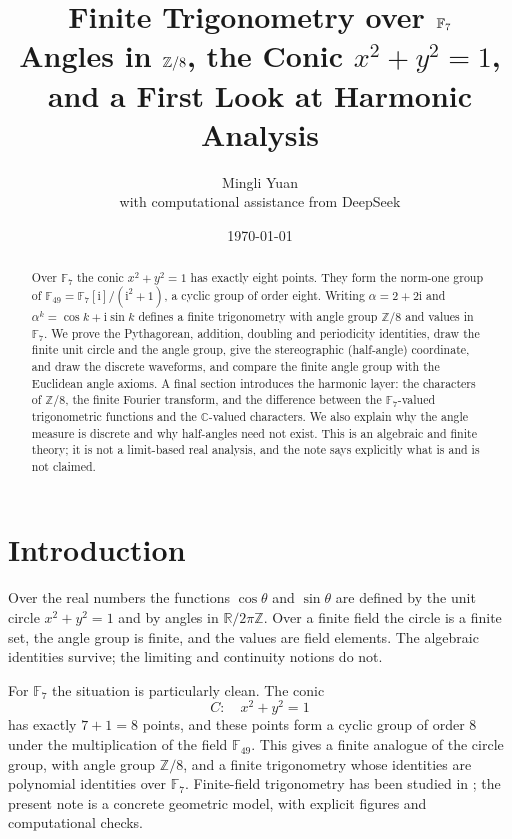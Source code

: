 \documentclass[11pt]{article}
\title{\textbf{Finite Trigonometry over \texorpdfstring{$\F_7$}{F7}}\\[0.4em]
\large Angles in \texorpdfstring{$\Z/8$}{Z/8}, the Conic \texorpdfstring{$x^2+y^2=1$}{x^2+y^2=1}, and a First Look at Harmonic Analysis}
\author{Mingli Yuan\\[0.3em]
\small with computational assistance from DeepSeek}
\date{\today}
\theoremstyle{definition}
\theoremstyle{remark}
\newcommand{\F}{\mathbb{F}}
\newcommand{\Z}{\mathbb{Z}}
\newcommand{\ii}{\mathrm{i}}
\begin{document}
\maketitle

\begin{abstract}
Over $\F_7$ the conic $x^2+y^2=1$ has exactly eight points.  They form the
norm-one group of $\F_{49}=\F_7[\ii]/(\ii^2+1)$, a cyclic group of order eight.
Writing $\alpha=2+2\ii$ and $\alpha^k=\cos k+\ii\sin k$ defines a finite
trigonometry with angle group $\Z/8$ and values in $\F_7$.  We prove the
Pythagorean, addition, doubling and periodicity identities, draw the finite unit
circle and the angle group, give the stereographic (half-angle) coordinate, and
draw the discrete waveforms, and compare the finite angle group with the Euclidean angle axioms.  A final section introduces the harmonic layer:
the characters of $\Z/8$, the finite Fourier transform, and the difference
between the $\F_7$-valued trigonometric functions and the $\mathbb C$-valued
characters.  We also explain why the angle measure is discrete and why half-angles need not exist.  This is an algebraic and finite theory; it is not a limit-based
real analysis, and the note says explicitly what is and is not claimed.
\end{abstract}

\tableofcontents

\section{Introduction}

Over the real numbers the functions $\cos\theta$ and $\sin\theta$ are defined by
the unit circle $x^2+y^2=1$ and by angles in $\mathbb R/2\pi\Z$.  Over a finite
field the circle is a finite set, the angle group is finite, and the values are
field elements.  The algebraic identities survive; the limiting and continuity
notions do not.

For $\F_7$ the situation is particularly clean.  The conic
\[
  C:\quad x^2+y^2=1
\]
has exactly $7+1=8$ points, and these points form a cyclic group of order $8$
under the multiplication of the field $\F_{49}$.  This gives a finite analogue
of the circle group, with angle group $\Z/8$, and a finite trigonometry whose
identities are polynomial identities over $\F_7$.  Finite-field trigonometry
has been studied in \cite{FFTrig}; the present note is a concrete geometric
model, with explicit figures and computational checks.
\end{document}
